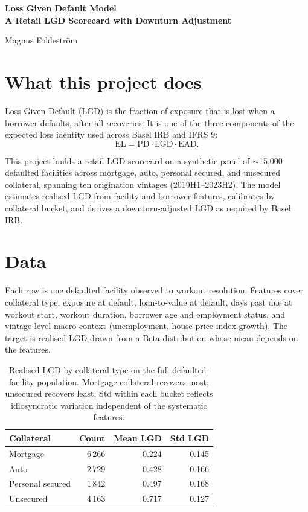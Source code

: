 \documentclass[a4paper,11pt]{article}
\begin{document}
\begin{titlepage}
\thispagestyle{empty}
\centering
\vspace*{3cm}
{\Huge\bfseries Loss Given Default Model\\\bigskip
\LARGE A Retail LGD Scorecard with Downturn Adjustment
\par}
\vspace{1.5cm}
{\Large Magnus Foldeström\par}
\vfill
\end{titlepage}

\section{What this project does}

Loss Given Default (LGD) is the fraction of exposure that is lost when
a borrower defaults, after all recoveries. It is one of the three
components of the expected loss identity used across Basel IRB and
IFRS 9:
$$\mathrm{EL} = \mathrm{PD} \cdot \mathrm{LGD} \cdot \mathrm{EAD}.$$

This project builds a retail LGD scorecard on a synthetic panel of
$\sim$15{,}000 defaulted facilities across mortgage, auto, personal
secured, and unsecured collateral, spanning ten origination vintages
(2019H1--2023H2). The model estimates realised LGD from facility and
borrower features, calibrates by collateral bucket, and derives a
downturn-adjusted LGD as required by Basel IRB.

\section{Data}

Each row is one defaulted facility observed to workout resolution.
Features cover collateral type, exposure at default, loan-to-value at
default, days past due at workout start, workout duration, borrower
age and employment status, and vintage-level macro context
(unemployment, house-price index growth). The target is realised LGD
drawn from a Beta distribution whose mean depends on the features.

\begin{table}[H]
\centering
\begin{tabular}{l r r r}
\toprule
\textbf{Collateral} & \textbf{Count} & \textbf{Mean LGD} & \textbf{Std LGD} \\
\midrule
Mortgage           & 6\,266 & 0.224 & 0.145 \\
Auto               & 2\,729 & 0.428 & 0.166 \\
Personal secured   & 1\,842 & 0.497 & 0.168 \\
Unsecured          & 4\,163 & 0.717 & 0.127 \\
\bottomrule
\end{tabular}
\caption{Realised LGD by collateral type on the full defaulted-facility
population. Mortgage collateral recovers most; unsecured recovers
least. Std within each bucket reflects idiosyncratic variation
independent of the systematic features.}
\end{table}
\end{document}
